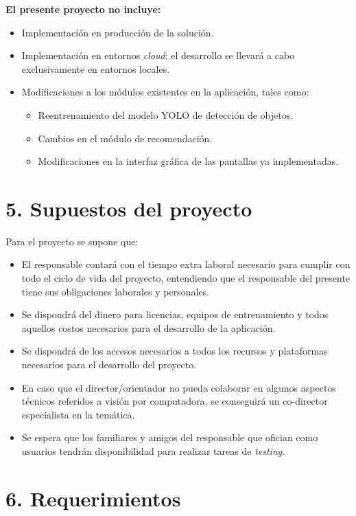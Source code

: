 \documentclass[
11pt, %
]{charter}
\begin{document}
\textbf{El presente proyecto no incluye:}
\begin{itemize}
    \item Implementación en producción de la solución.
    \item Implementación en entornos \textit{cloud}; el desarrollo se llevará a cabo exclusivamente en entornos locales.
    \item Modificaciones a los módulos existentes en la aplicación, tales como:
    \begin{itemize}
        \item Reentrenamiento del modelo YOLO de detección de objetos.
        \item Cambios en el módulo de recomendación.
        \item Modificaciones en la interfaz gráfica de las pantallas ya implementadas.
    \end{itemize}
\end{itemize}

\section{5. Supuestos del proyecto}
\label{sec:supuestos}
Para el proyecto se supone que:
\begin{itemize}
	\item El responsable contará con el tiempo extra laboral necesario para cumplir con todo el ciclo de vida del proyecto, entendiendo que el responsable del presente tiene sus obligaciones laborales y personales.
	\item Se dispondrá del dinero para licencias, equipos de entrenamiento y todos aquellos costos necesarios para el desarrollo de la aplicación.
	\item Se dispondrá de los accesos necesarios a todos los recursos y plataformas necesarios para el desarrollo del proyecto.
	\item En caso que el director/orientador no pueda colaborar en algunos aspectos técnicos referidos a visión por computadora, se conseguirá un co-director especialista en la temática.
	\item Se espera que los familiares y amigos del responsable que ofician como usuarios tendrán disponibilidad para realizar tareas de \textit{testing}.
\end{itemize}\section{6. Requerimientos}
\label{sec:requerimientos}
\end{document}
